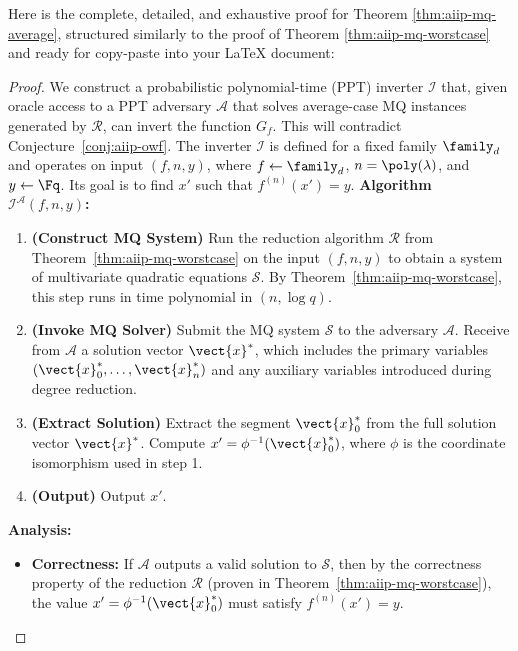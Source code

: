             Here is the complete, detailed, and exhaustive proof for Theorem \ref{thm:aiip-mq-average}, structured similarly to the proof of Theorem \ref{thm:aiip-mq-worstcase} and ready for copy-paste into your LaTeX document:
            \begin{proof}
                We construct a probabilistic polynomial-time (PPT) inverter $\mathcal{I}$ that, given oracle access to a PPT adversary $\mathcal{A}$ that solves average-case MQ instances generated by $\mathcal{R}$, can invert the function $G_f$. This will contradict Conjecture~\ref{conj:aiip-owf}.
                The inverter $\mathcal{I}$ is defined for a fixed family $\family_d$ and operates on input $(f, n, y)$, where $f \leftarrow \family_d$, $n = \poly(\lambda)$, and $y \leftarrow \Fq$. Its goal is to find $x'$ such that $f^{(n)}(x') = y$.
                \textbf{Algorithm $\mathcal{I}^{\mathcal{A}}(f, n, y)$:}
                \begin{enumerate}
                    \item \textbf{(Construct MQ System)} Run the reduction algorithm $\mathcal{R}$ from Theorem~\ref{thm:aiip-mq-worstcase} on the input $(f, n, y)$ to obtain a system of multivariate quadratic equations $\mathcal{S}$. By Theorem~\ref{thm:aiip-mq-worstcase}, this step runs in time polynomial in $(n, \log q)$.
                    \item \textbf{(Invoke MQ Solver)} Submit the MQ system $\mathcal{S}$ to the adversary $\mathcal{A}$. Receive from $\mathcal{A}$ a solution vector $\vect{x}^*$, which includes the primary variables $(\vect{x}_0^*, \ldots, \vect{x}_n^*)$ and any auxiliary variables introduced during degree reduction.
                    \item \textbf{(Extract Solution)} Extract the segment $\vect{x}_0^*$ from the full solution vector $\vect{x}^*$. Compute $x' = \phi^{-1}(\vect{x}_0^*)$, where $\phi$ is the coordinate isomorphism used in step 1.
                    \item \textbf{(Output)} Output $x'$.
                \end{enumerate}
                \textbf{Analysis:}
                \begin{itemize}
                    \item \textbf{Correctness:} If $\mathcal{A}$ outputs a valid solution to $\mathcal{S}$, then by the correctness property of the reduction $\mathcal{R}$ (proven in Theorem~\ref{thm:aiip-mq-worstcase}), the value $x' = \phi^{-1}(\vect{x}_0^*)$ must satisfy $f^{(n)}(x') = y$.

\end{itemize}
\end{proof}
